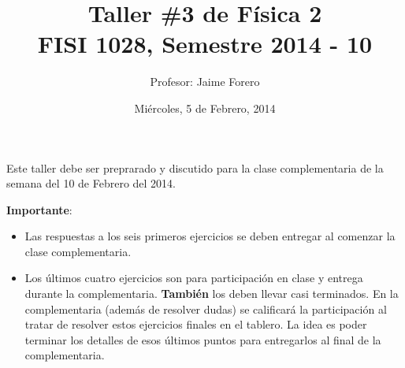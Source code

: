 \documentclass{article}
\title{Taller \#3 de F\'isica 2\\ FISI 1028, Semestre 2014 - 10}
\author{Profesor: Jaime Forero}
\date{Mi\'ercoles, 5 de Febrero, 2014}
\begin{document}
\maketitle
\thispagestyle{empty}

\noindent
Este taller debe ser preprarado y discutido para la clase
complementaria de la semana del 10 de Febrero del 2014. 

\noindent
{\bf Importante}:
\begin{itemize}

\item
Las respuestas a los seis primeros ejercicios se deben entregar al comenzar la
clase complementaria. 
\item 
Los \'ultimos cuatro ejercicios son para participaci\'on en clase y entrega
durante la complementaria. {\bf{Tambi\'en}} los deben llevar casi
terminados. En la complementaria (adem\'as de resolver dudas) se
calificar\'a la participaci\'on al tratar de resolver estos ejercicios
finales en el tablero. La idea es poder terminar los  detalles de esos
\'ultimos puntos para entregarlos al final de la complementaria.
\end{itemize}
\end{document}
